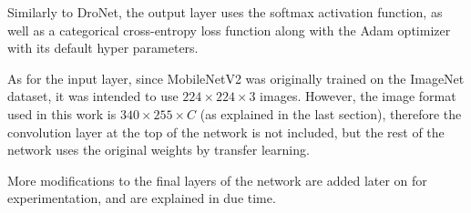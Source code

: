 Similarly to DroNet, the output layer uses the softmax activation function, as
well as a categorical cross-entropy loss function along with the Adam optimizer
with its default hyper parameters.

As for the input layer, since MobileNetV2 was originally trained on the
ImageNet dataset, it was intended to use $224\times224\times3$ images. However,
the image format used in this work is $340\times255\times C$ (as explained in
the last section), therefore the convolution layer at the top of the network is
not included, but the rest of the network uses the original weights by transfer
learning.

More modifications to the final layers of the network are added later on for
experimentation, and are explained in due time.
